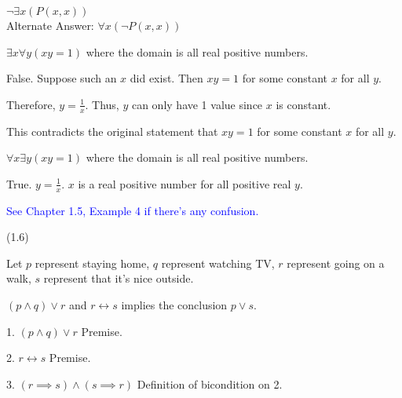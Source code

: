 \documentclass{exam}
\begin{document}
\begin{questions}
\begin{subparts}
\begin{center}
\( \neg \exists x (P(x, x)) \)
\\Alternate Answer: \( \forall x (\neg P(x, x)) \)
\end{center}

\end{subparts}

\begin{subparts}
\subpart \( \exists x \forall y (xy = 1) \) where the domain is all real positive numbers.

\begin{center}
False. Suppose such an \(x\) did exist. Then \(xy=1\) for some constant \(x\) for all \(y\).

Therefore, \(y = \frac{1}{x}\). Thus, \(y\) can only have 1 value since \(x\) is constant.

This contradicts the original statement that \(xy=1\) for some constant \(x\) for all \(y\).
\end{center}

\subpart \( \forall x \exists y (xy = 1) \) where the domain is all real positive numbers.

\begin{center}
True. \(y = \frac{1}{x}\). \(x\) is a real positive number for all positive real \(y\).

\vspace{5px} \textcolor{blue}{See Chapter 1.5, Example 4 if there's any confusion.}
\end{center}

\end{subparts}

\newpage

 (1.6)

\begin{center}
Let \(p\) represent staying home, \(q\) represent watching TV, \(r\) represent going on a walk, \(s\) represent that it's nice outside.

\( (p \land q) \lor r\) and \( r \longleftrightarrow s\) implies the conclusion \(p \lor s\).

1. \( (p \land q) \lor r\) Premise.

2. \( r \longleftrightarrow s\) Premise.

3. \( (r \implies s) \land (s \implies r)  \) Definition of bicondition on 2.


\end{center}
\end{questions}
\end{document}
